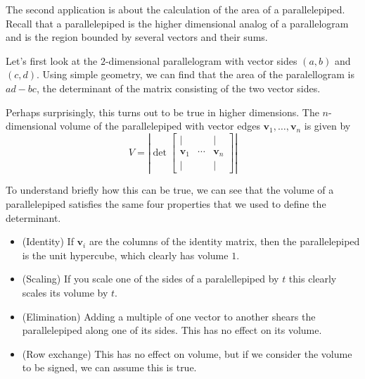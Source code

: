 \documentclass[11pt,oneside]{amsbook}
\theoremstyle{definition}
\theoremstyle{plain}
\theoremstyle{definition}
\theoremstyle{remark}
\numberwithin{equation}{section}
\numberwithin{figure}{section}
\begin{document}
The second application is about the calculation of the area of a parallelepiped. Recall that a parallelepiped is the higher dimensional analog of a parallelogram and is the region bounded by several vectors and their sums.

Let's first look at the $2$-dimensional parallelogram with vector sides $(a,b)$ and $(c,d)$. Using simple geometry, we can find that the area of the paralellogram is $ad-bc$, the determinant of the matrix consisting of the two vector sides.
\begin{center}
\end{center}

Perhaps surprisingly, this turns out to be true in higher dimensions. The $n$-dimensional volume of the parallelepiped with vector edges $\mathbf{v}_1,\ldots,\mathbf{v}_n$ is given by
\[V=\left|\det\begin{bmatrix}
      |&&|\\
      \mathbf{v}_1&\cdots&\mathbf{v}_n\\
      |&&|
    \end{bmatrix}\right|
\]

To understand briefly how this can be true, we can see that the volume of a parallelepiped satisfies the same four properties that we used to define the determinant.
\begin{itemize}
  \item (Identity) If $\mathbf{v}_i$ are the columns of the identity matrix, then the parallelepiped is the unit hypercube, which clearly has volume $1$.
  \item (Scaling) If you scale one of the sides of a paralellepiped by $t$ this clearly scales its volume by $t$.
  \item (Elimination) Adding a multiple of one vector to another shears the parallelepiped along one of its sides. This has no effect on its volume.
  \item (Row exchange) This has no effect on volume, but if we consider the volume to be signed, we can assume this is true.
\end{itemize}
\end{document}
